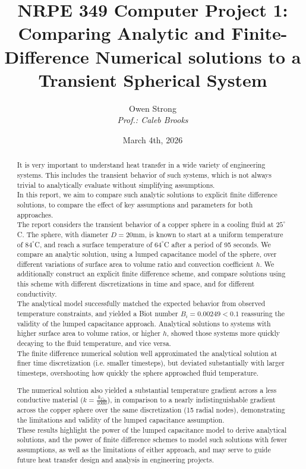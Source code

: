 \documentclass[12pt]{article}
\title{NRPE 349 Computer Project 1: Comparing Analytic and Finite-Difference Numerical solutions to a Transient Spherical System}
\author{Owen Strong \\
\itshape Prof.: Caleb Brooks
}
\date{March 4th, 2026}
\begin{document}
\maketitle
\pagebreak
{\hypersetup{linkcolor=black}\tableofcontents}
\pagebreak
{}
\begin{abstract}
    It is very important to understand heat transfer in a wide variety of engineering systems.
    This includes the transient behavior of such systems, which is not always trivial to analytically evaluate without simplifying assumptions.\\

    In this report, we aim to compare such analytic solutions to explicit finite difference solutions, to compare the effect of key assumptions and parameters for both approaches.\\

    The report considers the transient behavior of a copper sphere in a cooling fluid at $25^\circ$C.
    The sphere, with diameter $D=20$mm, is known to start at a uniform temperature of $84^\circ$C, and reach a surface temperature of $64^\circ$C after a period of 95 seconds.
    We compare an analytic solution, using a lumped capacitance model of the sphere, over different variations of surface area to volume ratio and convection coefficient $h$.
    We additionally construct an explicit finite difference scheme, and compare solutions using this scheme with different discretizations in time and space, and for different conductivity.\\

    The analytical model successfully matched the expected behavior from observed temperature constraints, and yielded a Biot number $B_i=0.00249<0.1$ reassuring the validity of the lumped capacitance approach.
    Analytical solutions to systems with higher surface area to volume ratios, or higher $h$, showed those systems more quickly decaying to the fluid temperature, and vice versa.\\

    The finite difference numerical solution well approximated the analytical solution at finer time discretization (i.e. smaller timesteps), but deviated substantially with larger timesteps, overshooting how quickly the sphere approached fluid temperature.

    The numerical solution also yielded a substantial temperature gradient across a less conductive material ($k=\frac{k_{Cu}}{1000}$), in comparison to a nearly indistinguishable gradient across the copper sphere over the same discretization (15 radial nodes), demonstrating the limitations and validity of the lumped capacitance assumption.\\

    These results highlight the power of the lumped capacitance model to derive analytical solutions, and the power of finite difference schemes to model such solutions with fewer assumptions, as well as the limitations of either approach, and may serve to guide future heat transfer design and analysis in engineering projects.
\end{abstract}
\end{document}
